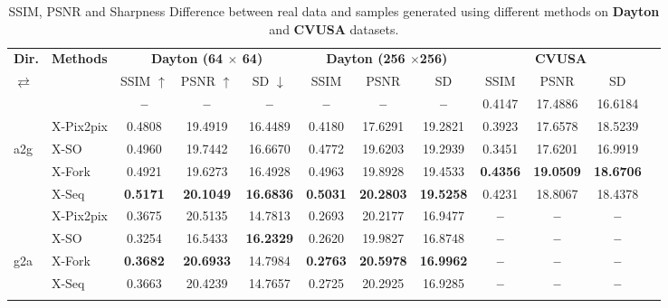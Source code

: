 \documentclass[times,twocolumn,final,authoryear]{elsarticle_modified}
\begin{document}
\begin{table*}[htbp]
 \small
   \renewcommand{\arraystretch}{.8}
  \centering
\caption{\small SSIM, PSNR and Sharpness Difference between real data and samples generated using different methods on \textbf{Dayton} and \textbf{CVUSA} datasets.}
  \vspace{-10pt}
  \label{tab:ssim_psnr_sd}
  
    \begin{tabular*}{\textwidth}{l @{\extracolsep{\fill}} lcccccccccc}
        \toprule
             \multicolumn{1}{l}{\textbf{Dir.}} &   \multicolumn{1}{l}{\textbf{Methods}} & \multicolumn{3}{c}{\textbf{Dayton (64 $\times$ 64)}} & \multicolumn{3}{c}{\textbf{Dayton (256 $\times $256)}} & \multicolumn{3}{c}{\textbf{CVUSA}}     \\
                \cmidrule(lr){3-5}
\cmidrule(lr){6-8} \cmidrule(lr){9-11}
    $\rightleftarrows$     &  & SSIM $\uparrow$ & PSNR $\uparrow$ & SD $\downarrow$ & SSIM  & PSNR & SD & SSIM & PSNR & SD \\
        \midrule
   &  \cite{zhai2017crossview} & \textbf{--} & \textbf{--} & \textbf{--} & \textbf{--} & \textbf{--} & \textbf{--}  & 0.4147 & 17.4886 & 16.6184 \\
    & X-Pix2pix  & 0.4808 & 19.4919 & 16.4489 & 0.4180 & 17.6291 & 19.2821  & 0.3923 & 17.6578 & 18.5239 \\
     a2g &  X-SO & 0.4960 & 19.7442 & 16.6670 & 0.4772 & 19.6203 & 19.2939 & {0.3451} & {17.6201} & {16.9919} \\

   & X-Fork & 0.4921 & 19.6273 & 16.4928 & 0.4963 & 19.8928 & 19.4533  & \textbf{0.4356} & \textbf{19.0509} & \textbf{18.6706}\\
   & X-Seq & \textbf{0.5171} & \textbf{20.1049} & \textbf{16.6836} & \textbf{0.5031} & \textbf{20.2803} & \textbf{19.5258}  & 0.4231 & 18.8067 & 18.4378 \\
    \midrule
  &  X-Pix2pix & 0.3675 & 20.5135 & {14.7813} & 0.2693 & 20.2177 & 16.9477 & \textbf{--} & \textbf{--} & \textbf{--} \\
  &  X-SO & 0.3254 & 16.5433 & \textbf{16.2329} & 0.2620 & 19.9827 & 16.8748 & \textbf{--} & \textbf{--} & \textbf{--} \\
  g2a &  X-Fork & \textbf{0.3682} & \textbf{20.6933} & {14.7984} & \textbf{0.2763} & \textbf{20.5978} & \textbf{16.9962}  &  \textbf{--} & \textbf{--} & \textbf{--}\\
 &   X-Seq & {0.3663} & {20.4239} & {14.7657} & {0.2725} & {20.2925} & {16.9285}  & \textbf{--} & \textbf{--} & \textbf{--} \\
        \bottomrule
         \vspace{-10pt}
    \end{tabular*}
\end{table*}  
\end{document}
